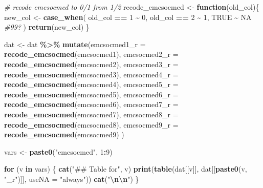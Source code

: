 \documentclass[
]{article}
\newenvironment{Shaded}{\begin{snugshade}}{\end{snugshade}}
\newcommand{\AttributeTok}[1]{\textcolor[rgb]{0.13,0.29,0.53}{#1}}
\newcommand{\CommentTok}[1]{\textcolor[rgb]{0.56,0.35,0.01}{\textit{#1}}}
\newcommand{\ConstantTok}[1]{\textcolor[rgb]{0.56,0.35,0.01}{#1}}
\newcommand{\ControlFlowTok}[1]{\textcolor[rgb]{0.13,0.29,0.53}{\textbf{#1}}}
\newcommand{\DecValTok}[1]{\textcolor[rgb]{0.00,0.00,0.81}{#1}}
\newcommand{\FunctionTok}[1]{\textcolor[rgb]{0.13,0.29,0.53}{\textbf{#1}}}
\newcommand{\NormalTok}[1]{#1}
\newcommand{\OtherTok}[1]{\textcolor[rgb]{0.56,0.35,0.01}{#1}}
\newcommand{\SpecialCharTok}[1]{\textcolor[rgb]{0.81,0.36,0.00}{\textbf{#1}}}
\newcommand{\StringTok}[1]{\textcolor[rgb]{0.31,0.60,0.02}{#1}}
\begin{document}
\begin{Shaded}
\begin{Highlighting}[]
\CommentTok{\# recode emcsocmed to 0/1 from 1/2}
\NormalTok{recode\_emcsocmed }\OtherTok{\textless{}{-}} \ControlFlowTok{function}\NormalTok{(old\_col)\{}
\NormalTok{  new\_col }\OtherTok{\textless{}{-}} \FunctionTok{case\_when}\NormalTok{(}
\NormalTok{    old\_col }\SpecialCharTok{==} \DecValTok{1} \SpecialCharTok{\textasciitilde{}} \DecValTok{0}\NormalTok{,}
\NormalTok{    old\_col }\SpecialCharTok{==} \DecValTok{2} \SpecialCharTok{\textasciitilde{}} \DecValTok{1}\NormalTok{,}
    \ConstantTok{TRUE} \SpecialCharTok{\textasciitilde{}} \ConstantTok{NA} \CommentTok{\#99?}
\NormalTok{  )}
  \FunctionTok{return}\NormalTok{(new\_col)}
\NormalTok{\}}

\NormalTok{dat }\OtherTok{\textless{}{-}}\NormalTok{ dat }\SpecialCharTok{\%\textgreater{}\%}
  \FunctionTok{mutate}\NormalTok{(}\AttributeTok{emcsocmed1\_r =} \FunctionTok{recode\_emcsocmed}\NormalTok{(emcsocmed1),}
         \AttributeTok{emcsocmed2\_r =} \FunctionTok{recode\_emcsocmed}\NormalTok{(emcsocmed2),}
         \AttributeTok{emcsocmed3\_r =} \FunctionTok{recode\_emcsocmed}\NormalTok{(emcsocmed3),}
         \AttributeTok{emcsocmed4\_r =} \FunctionTok{recode\_emcsocmed}\NormalTok{(emcsocmed4),}
         \AttributeTok{emcsocmed5\_r =} \FunctionTok{recode\_emcsocmed}\NormalTok{(emcsocmed5),}
         \AttributeTok{emcsocmed6\_r =} \FunctionTok{recode\_emcsocmed}\NormalTok{(emcsocmed6),}
         \AttributeTok{emcsocmed7\_r =} \FunctionTok{recode\_emcsocmed}\NormalTok{(emcsocmed7),}
         \AttributeTok{emcsocmed8\_r =} \FunctionTok{recode\_emcsocmed}\NormalTok{(emcsocmed8),}
         \AttributeTok{emcsocmed9\_r =} \FunctionTok{recode\_emcsocmed}\NormalTok{(emcsocmed9)}
\NormalTok{         ) }

\NormalTok{vars }\OtherTok{\textless{}{-}} \FunctionTok{paste0}\NormalTok{(}\StringTok{"emcsocmed"}\NormalTok{, }\DecValTok{1}\SpecialCharTok{:}\DecValTok{9}\NormalTok{)}

\ControlFlowTok{for}\NormalTok{ (v }\ControlFlowTok{in}\NormalTok{ vars) \{}
  \FunctionTok{cat}\NormalTok{(}\StringTok{"\#\# Table for"}\NormalTok{, v)}
  \FunctionTok{print}\NormalTok{(}\FunctionTok{table}\NormalTok{(dat[[v]], dat[[}\FunctionTok{paste0}\NormalTok{(v, }\StringTok{"\_r"}\NormalTok{)]], }\AttributeTok{useNA =} \StringTok{"always"}\NormalTok{))}
  \FunctionTok{cat}\NormalTok{(}\StringTok{"}\SpecialCharTok{\textbackslash{}n\textbackslash{}n}\StringTok{"}\NormalTok{)}
\NormalTok{\}}
\end{Highlighting}
\end{Shaded}
\end{document}
